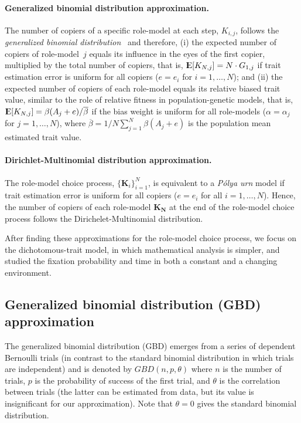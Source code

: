 \documentclass[12pt]{extarticle}
\DeclareMathOperator*{\E}{{\rm I\kern-.3em E}}
\let\vec\mathbf
\begin{document}
\paragraph{Generalized binomial distribution approximation.}  
The number of copiers of a specific role-model at each step, $K_{i,j}$, follows the {\em generalized binomial distribution}~\citep{GBD} and therefore, 
(i) the expected number of copiers of role-model~$j$ equals its influence in the eyes of the first copier, multiplied by the total number of copiers, that is,
$\E[K_{N,j}] = N \cdot G_{1,j}$ if trait estimation error is uniform for all copiers ($e=e_i$ for $i=1, \ldots, N$); and
(ii) the expected number of copiers of each role-model equals its relative biased trait value, similar to the role of relative fitness in population-genetic models, that is, $\E[K_{N,j}] = \beta(A_j+e) / \overline{\beta}$ if the bias weight is uniform for all role-models ($\alpha=\alpha_j$ for $j=1,\ldots,N$), where $\overline{\beta}=1/N \sum_{j=1}^{N}{\beta(A_j+e)}$ is the population mean estimated trait value. 

\paragraph{Dirichlet-Multinomial distribution approximation.}
The role-model choice process, $\{\vec{K}_{i}\}_{i=1}^{N}$, is equivalent to a {\em P\'{o}lya urn} model if trait estimation error is uniform for all copiers ($e=e_i$ for all $i=1, \ldots, N$). 
Hence, the number of copiers of each role-model $\vec{K_{N}}$ at the end of the role-model choice process follows the Dirichelet-Multinomial distribution.

After finding these approximations for the role-model choice process, we focus on the dichotomous-trait model, in which mathematical analysis is simpler, and studied the fixation probability and time in both a constant and a changing environment.

\subsection*{Generalized binomial distribution (GBD) approximation}
The generalized binomial distribution (GBD) emerges from a series of dependent Bernoulli trials (in contrast to the standard binomial distribution in which trials are independent) and is {denoted}  by $GBD(n, p, \theta)$ where $n$ is the number of trials, $p$ is the probability of success of the first trial, and $\theta$ is the correlation between trials (the latter can be estimated from data, but its value is insignificant for our approximation). Note that $\theta=0$ gives the standard binomial distribution.
\\
\end{document}
